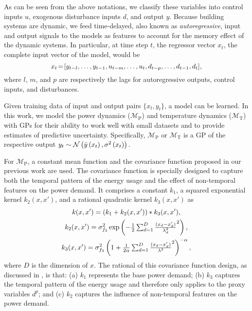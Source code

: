 As can be seen from the above notations, we classify these variables into control inputs \(u\), exogenous disturbance inputs \(d\), and output \(y\).
Because building systems are dynamic, we feed time-delayed, also known as \emph{autoregressive}, input and output signals to the models as features to account for the memory effect of the dynamic systems.
In particular, at time step $t$, the regressor vector $x_{t}$, \ie the complete input vector of the model, would be
\begin{equation}
  \label{E:GP:features}
  x_{t}\!=\![y_{t-l}, \dots, y_{t-1}, u_{t-m}, \dots, u_t, d_{t-p}, \dots, d_{t-1}, d_t] \text,
\end{equation}
where \(l\), \(m\), and \(p\) are respectively the lags for autoregressive outputs, control inputs, and disturbances.

Given training data of input and output pairs $\{x_{t}, y_{t}\}$, a model can be learned.
%
In this work, we model the power dynamics ($\mathcal{M}_{\mathrm{P}}$) and temperature dynamics ($\mathcal{M}_{\mathrm{T}}$) with GPs for their ability to work well with small datasets and to provide estimates of predictive uncertainty.
Specifically, $\mathcal{M}_{\mathrm{P}}$ or $\mathcal{M}_{\mathrm{T}}$ is a GP of the respective output
\begin{math}
  y_{t} \sim \operatorname*{\mathcal{N}}\left(\bar{y}\left(x_{t}\right), \sigma^{2}\left(x_{t}\right)\right) \text.
\end{math}

For $\mathcal{M}_{\mathrm{P}}$, a constant mean function and the covariance function proposed in our previous work \cite{nghiemetal16gp} are used.
The covariance function is specially designed to capture both the temporal pattern of the energy usage and the effect of non-temporal features on the power demand.
It comprises a constant \(k_{1}\), a squared exponential kernel \(k_2(x,x')\), and a rational quadratic kernel \(k_{3}(x,x')\) as
%
\begin{gather}
  k(x,x') = \left(k_1 + k_2(x,x')\right)*k_3(x,x')\text,\nonumber\\
  k_2(x,x') = \sigma_{f_2}^2 \exp \left( -\textstyle\frac{1}{2} \textstyle\sum_{d=1}^D \frac{(x_d-x_d')}{{\lambda_d^2}}^2 \right)\text,
 \nonumber\\
 k_3(x,x') = \sigma_{f_3}^2  \left( 1+ \textstyle\frac{1}{2\alpha} \textstyle\sum_{d=1}^D \frac{(x_d-x_d')}{{\lambda^2}}^2 \right)^{-\alpha}\text,
\end{gather}
%
where \(D\) is the dimension of \(x\).
The rational of this covariance function design, as discussed in \cite{nghiemetal16gp}, is that:
(a) $k_{1}$ represents the base power demand;
(b) $k_{3}$ captures the temporal pattern of the energy usage and therefore only applies to the proxy variables $d^{p}$; and
(c) $k_{2}$ captures the influence of non-temporal features on the power demand.

